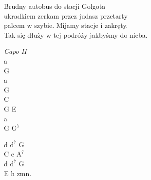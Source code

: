 \begin{text}
    Brudny autobus do stacji Golgota\\
    ukradkiem zerkam przez judasz przetarty\\
    palcem w szybie. Mijamy stacje i zakręty.\\
    Tak się dłuży w tej podróży jakbyśmy do nieba.
\end{text}
\begin{chord}
    \textit{Capo II}\\
    a\\
    G\\
    a\\
    G\\
    C\\
    G E\\
    a\\
    G $\mathrm{G^7}$

    d $\mathrm{d^7}$ G\\
    C e $\mathrm{A^7}$\\
    d $\mathrm{d^7}$ G\\
    E h zmn.
\end{chord}
